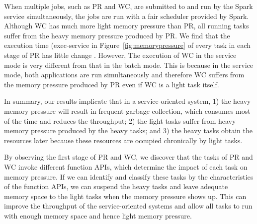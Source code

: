 When multiple jobs, such as PR and WC, are submitted to and run by the Spark service simultaneously, the jobs are run with a fair scheduler provided by Spark. Although WC has much more light memory pressure than PR, all running tasks suffer from the heavy memory pressure produced by PR. We find that the execution time (exec-service in Figure~\ref{fig:memorypressure} of every task in each stage of PR has little change
. However, The execution of WC in the service mode is very different from that in the batch mode. This is because in the service mode, both applications are run simultaneously and therefore WC suffers from the memory pressure produced by PR even if WC is a light task itself. 

In summary, our results implicate that in a service-oriented system, 1) the heavy memory pressure will result in frequent garbage collection, which consumes most of the time and reduces the throughput; 2) the light tasks suffer from heavy memory pressure produced by the heavy tasks; and 3) the heavy tasks obtain the resources later because these resources are occupied chronically by light tasks.

By observing the first stage of PR and WC, we discover that the tasks of PR and WC invoke different function APIs, which determine the impact of each task on memory pressure. If we can identify and classify these tasks by the characteristics of the function APIs, we can suspend the heavy tasks and leave adequate memory space to the light tasks when the memory pressure shows up. This can improve the throughput of the service-oriented systems and allow all tasks to run with enough memory space and hence light memory pressure. 
  
